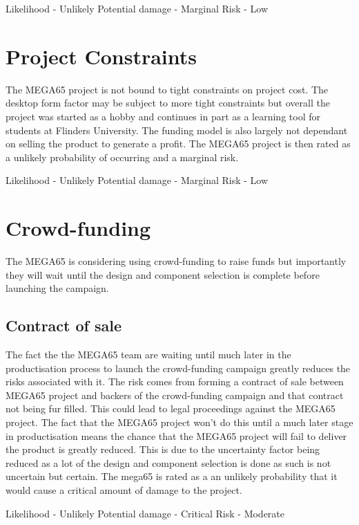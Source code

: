 Likelihood - Unlikely
Potential damage - Marginal
Risk - Low


\section{Project Constraints}
The MEGA65 project is not bound to tight constraints on project cost. The desktop form factor may be subject to more tight constraints but overall the project was started as a hobby and continues in part as a learning tool for students at Flinders University. The funding model is also largely not dependant on selling the product to generate a profit. The MEGA65 project is then rated as a unlikely probability of occurring and a marginal risk.

Likelihood - Unlikely
Potential damage - Marginal
Risk - Low


\section{Crowd-funding}
The MEGA65 is considering using crowd-funding to raise funds but importantly they will wait until the design and component selection is complete before launching the campaign.

\subsection{Contract of sale}
The fact the the MEGA65 team are waiting until much later in the productisation process to launch the crowd-funding campaign greatly reduces the risks associated with it. The risk comes from forming a contract of sale between MEGA65 project and backers of the crowd-funding campaign and that contract not being fur filled. This could lead to legal proceedings against the MEGA65 project. The fact that the MEGA65 project won't do this until a much later stage in productisation means the chance that the MEGA65 project will fail to deliver the product is greatly reduced. This is due to the uncertainty factor being reduced as a lot of the design and component selection is done as such is not uncertain but certain. The mega65 is rated as a an unlikely probability that it would cause a critical amount of damage to the project.

Likelihood - Unlikely
Potential damage - Critical
Risk - Moderate


